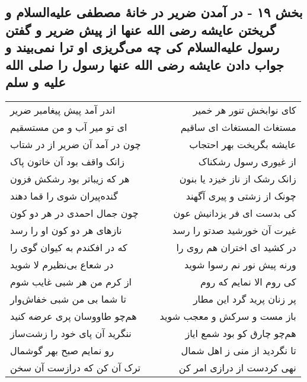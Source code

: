 \begin{center}
\section*{بخش ۱۹ - در آمدن ضریر در خانهٔ مصطفی علیه‌السلام و گریختن عایشه رضی الله عنها از پیش ضریر و گفتن رسول علیه‌السلام کی چه می‌گریزی او ترا نمی‌بیند و جواب دادن عایشه رضی الله عنها رسول را صلی الله علیه و سلم}
\label{sec:sh019}
\begin{longtable}{l p{0.5cm} r}
اندر آمد پیش پیغامبر ضریر
&&
کای نوابخش تنور هر خمیر
\\
ای تو میر آب و من مستسقیم
&&
مستغاث المستغاث ای ساقیم
\\
چون در آمد آن ضریر از در شتاب
&&
عایشه بگریخت بهر احتجاب
\\
زانک واقف بود آن خاتون پاک
&&
از غیوری رسول رشکناک
\\
هر که زیباتر بود رشکش فزون
&&
زانک رشک از ناز خیزد یا بنون
\\
گنده‌پیران شوی را قما دهند
&&
چونک از زشتی و پیری آگهند
\\
چون جمال احمدی در هر دو کون
&&
کی بدست ای فر یزدانیش عون
\\
نازهای هر دو کون او را رسد
&&
غیرت آن خورشید صدتو را رسد
\\
که در افکندم به کیوان گوی را
&&
در کشید ای اختران هم روی را
\\
در شعاع بی‌نظیرم لا شوید
&&
ورنه پیش نور نم رسوا شوید
\\
از کرم من هر شبی غایب شوم
&&
کی روم الا نمایم که روم
\\
تا شما بی من شبی خفاش‌وار
&&
پر زنان پرید گرد این مطار
\\
هم‌چو طاووسان پری عرضه کنید
&&
باز مست و سرکش و معجب شوید
\\
ننگرید آن پای خود را زشت‌ساز
&&
هم‌چو چارق کو بود شمع ایاز
\\
رو نمایم صبح بهر گوشمال
&&
تا نگردید از منی ز اهل شمال
\\
ترک آن کن که درازست آن سخن
&&
نهی کردست از درازی امر کن
\\
\end{longtable}
\end{center}
